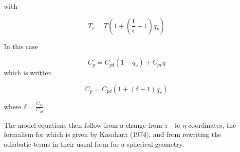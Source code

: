 with

\begin{equation}
T_{v}=T\left(1+\left(\frac{1}{\epsilon}-1\right)q_{v}\right)\label{A.7.7}
\end{equation}

In this case

\begin{equation*}
C_{p}=C_{pd}\left(1-q_{v}\right)+C_{pv}q
\end{equation*}
which is written

\begin{equation}
C_{p}=C_{pd}\left(1+\left(\delta -1\right)q_{v}\right)\label{A.7.8}
\end{equation}

where $\delta=\frac{C_{pv}}{C_{pd}}$.

The model equations then follow from a change from $z$ -
to $\eta$-coordinates, the formalism for which is given by Kasahara (1974),
and from rewriting the adiabatic terms in their usual form for a
spherical geometry.

